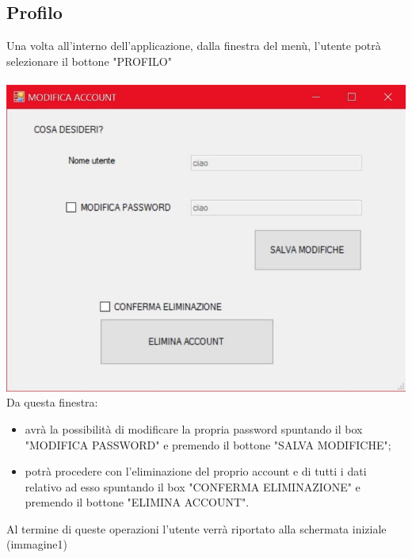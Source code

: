 \documentclass[a4paper, titlepage]{article}
\begin{document}
\subsection{Profilo}
Una volta all'interno dell'applicazione, dalla finestra del menù, l'utente potrà selezionare il bottone "PROFILO"\\\\
\includegraphics[scale=0.30]{Immagini/form/Form GestioneUtente.jpg}
\\Da questa finestra:
\begin{itemize}
    \item avrà la possibilità di modificare la propria password spuntando il box "MODIFICA PASSWORD" e premendo il bottone "SALVA MODIFICHE";
    \item potrà procedere con l'eliminazione del proprio account e di tutti i dati relativo ad esso spuntando il box "CONFERMA ELIMINAZIONE" e premendo il bottone "ELIMINA ACCOUNT".
\end{itemize} 
Al termine di queste operazioni l'utente verrà riportato alla schermata iniziale (immagine1)
\newpage
\end{document}
